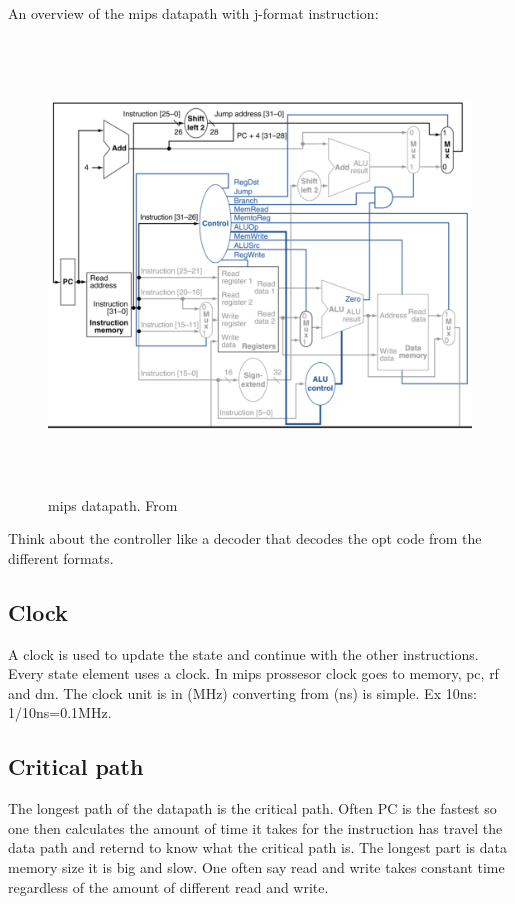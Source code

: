 \newpage

An overview of the mips datapath with j-format instruction:
\begin{figure}[h]
    \vspace{10mm}
    \centering
    \includegraphics[width=16cm, height=12cm]{image/mips-datapath.png} 
    \caption{mips datapath. From \cite{}}
    \label{mips-datapath}
\end{figure}

Think about the controller like a decoder that decodes the opt code from the different formats.

\newpage

\subsection{Clock}
A clock is used to update the state and continue with the other instructions. Every state element uses
a clock. In mips prossesor clock goes to memory, pc, rf and dm. The clock unit is in (MHz) converting
from (ns) is simple. Ex 10ns: 1/10ns=0.1MHz.

\subsection{Critical path}
The longest path of the datapath is the critical path. Often PC is the fastest so one then calculates the
amount of time it takes for the instruction has travel the data path and reternd to know what the
critical path is. The longest part is data memory size it is big and slow. One often say read and write
takes constant time regardless of the amount of different read and write.


